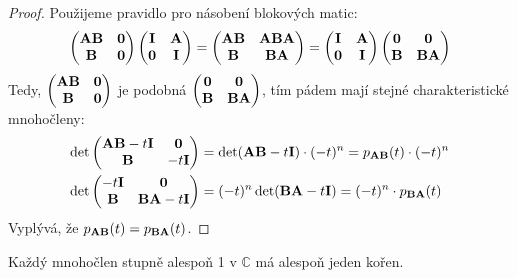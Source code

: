 \begin{proof}
    Použijeme pravidlo pro násobení blokových matic:
    $$\begin{pmatrix}
        \mathbf{A}\mathbf{B} &\mathbf{0} \\
        \mathbf{B} &\mathbf{0}
    \end{pmatrix}
    \begin{pmatrix}
        \mathbf{I} &\mathbf{A} \\
        \mathbf{0} &\mathbf{I}
    \end{pmatrix}
    =
    \begin{pmatrix}
        \mathbf{A}\mathbf{B} &\mathbf{A}\mathbf{B}\mathbf{A} \\
        \mathbf{B} &\mathbf{B}\mathbf{A}
    \end{pmatrix}
    =
    \begin{pmatrix}
        \mathbf{I} &\mathbf{A} \\
        \mathbf{0} &\mathbf{I}
    \end{pmatrix}
    \begin{pmatrix}
        \mathbf{0} &\mathbf{0} \\
        \mathbf{B} &\mathbf{B}\mathbf{A}
    \end{pmatrix}$$
    Tedy, $\begin{pmatrix}
        \mathbf{A}\mathbf{B} &\mathbf{0} \\
        \mathbf{B} &\mathbf{0}
    \end{pmatrix}$ je podobná
    $\begin{pmatrix}
        \mathbf{0} &\mathbf{0} \\
        \mathbf{B} &\mathbf{B}\mathbf{A}
    \end{pmatrix}$, tím pádem mají stejné charakteristické mnohočleny:
    \begin{align*}
    \det\begin{pmatrix}
        \mathbf{A}\mathbf{B}-t\mathbf{I} &\mathbf{0} \\
        \mathbf{B} &-t\mathbf{I}
    \end{pmatrix} &= \det(\mathbf{A}\mathbf{B} - t\mathbf{I}) \cdot (-t)^n 
    = p_{\mathbf{A}\mathbf{B}}(t)\cdot(-t)^n \\
    \det\begin{pmatrix}
        -t\mathbf{I} &\mathbf{0} \\
        \mathbf{B} &\mathbf{B}\mathbf{A} -t\mathbf{I}
    \end{pmatrix} &= (-t)^n \det(\mathbf{B}\mathbf{A}-t\mathbf{I}) = (-t)^n \cdot p_{\mathbf{B}\mathbf{A}}(t)
    \end{align*}
    Vyplývá, že $p_{\mathbf{A}\mathbf{B}}(t) = p_{\mathbf{B}\mathbf{A}}(t)$.
\end{proof}

\begin{theorem}
    Každý mnohočlen stupně alespoň 1 v $\mathbb{C}$ má alespoň jeden kořen.
\end{theorem}

